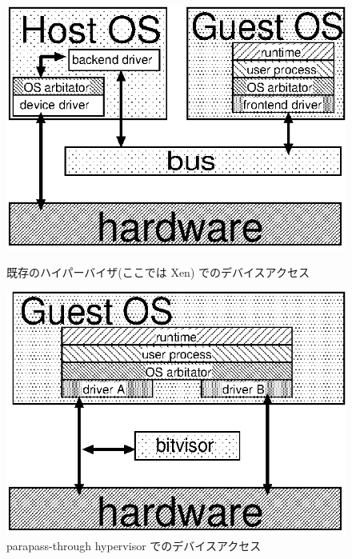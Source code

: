 \documentclass[a4paper,11pt,report]{ltjsbook}
\begin{document}
\begin{figure}[htbp]
  \begin{minipage}{0.5\hsize}
    \begin{center}
      \includegraphics[width=\textwidth]{./xen.eps}
      \caption{既存のハイパーバイザ(ここでは Xen) でのデバイスアクセス}
      \label{existhyp}
    \end{center}
  \end{minipage}
  \begin{minipage}{0.5\hsize}
    \begin{center}
      \includegraphics[width=\textwidth]{./bitvisor.eps}
      \caption{parapass-through hypervisor でのデバイスアクセス}
      \label{bitv}
    \end{center}
  \end{minipage}
\end{figure}
\end{document}
